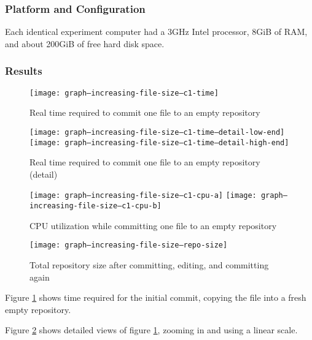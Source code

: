 \documentclass[a4paper]{article}
\begin{document}
\subsubsection{Platform and Configuration}

Each identical experiment computer had a 3GHz Intel processor, 8GiB of RAM, and
about 200GiB of free hard disk space.

\fi

\subsubsection{Results}

\begin{figure}[p]
  \caption{Real time required to commit one file to an empty repository}
  \label{fig:graph--increasing-file-size--c1-time}
  \centering
    \texttt{[image: graph--increasing-file-size--c1-time]}
\end{figure}

\begin{figure}[p]
  \caption{Real time required to commit one file to an empty repository (detail)}
  \label{fig:graph--increasing-file-size--c1-time--detail-high-end}
  \centering
    \texttt{[image: graph--increasing-file-size--c1-time--detail-low-end]}
    \texttt{[image: graph--increasing-file-size--c1-time--detail-high-end]}
\end{figure}

\begin{figure}[p]
  \caption{CPU utilization while committing one file to an empty repository}
  \label{fig:graph--increasing-file-size--c1-cpu}
  \centering
    \texttt{[image: graph--increasing-file-size--c1-cpu-a]}
    \texttt{[image: graph--increasing-file-size--c1-cpu-b]}
\end{figure}

\begin{figure}[p]
  \caption{Total repository size after committing, editing, and committing again}
  \label{fig:graph--increasing-file-size--repo-size}
  \centering
    \texttt{[image: graph--increasing-file-size--repo-size]}
\end{figure}

Figure \ref{fig:graph--increasing-file-size--c1-time} shows time required for
the initial commit, copying the file into a fresh empty repository.

Figure \ref{fig:graph--increasing-file-size--c1-time--detail-high-end} shows
detailed views of figure \ref{fig:graph--increasing-file-size--c1-time}, zooming
in and using a linear scale.
\end{document}
